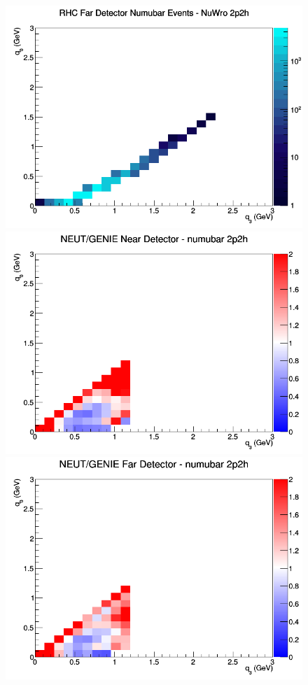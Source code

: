 \begin{figure}[h]
\endminipage
{}
\includegraphics[width=\linewidth]{q0_q3/nominal/2p2h_RHC_FD_numubar_q3_q0_NuWro.png}
\endminipage
\newline
{}
\includegraphics[width=\linewidth]{q0_q3/nominal/ratios/2p2h_NEUT_GENIE_numubar_near_q3_q0.png}
\endminipage
{}
\includegraphics[width=\linewidth]{q0_q3/nominal/ratios/2p2h_NEUT_GENIE_numubar_far_q3_q0.png}

\end{figure}
